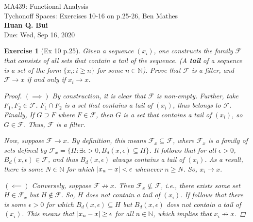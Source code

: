\documentclass[11pt]{article}
\newtheorem{exercise}{Exercise}
\newcommand{\N}{\mathbb{N}}
\newcommand{\F}{\mathcal{F}}
\begin{document}
\begin{center}
\begin{framed}
{\Large  MA439: Functional Analysis\\
	 Tychonoff Spaces:  Exercises 10-16 on p.25-26, Ben Mathes}\\
$\,$\\
{\Large \bf  Huan Q. Bui\\}
$\,$\\
{\Large Due: Wed, Sep 16, 2020}
\end{framed}
\end{center}

\begin{exercise}[Ex 10 p.25]
Given a sequence $(x_i)$, one constructs the family $\mathcal{F}$ that consists of all sets that contain a tail of the sequence. (A \textbf{tail} of a sequence is a set of the form $\{x_i : i \geq n \}$ for some $n \in \mathbb{N}$). Prove that $\mathcal{F}$ is a filter, and $\mathcal{F} \to x$ if and only if $x_i \to x$.
	\begin{proof}
	$(\implies)$ By construction, it is clear that $\F$ is non-empty. Further, take $F_1,F_2\in \F$. $F_1\cap F_2$ is a set that contains a tail of $(x_i)$, thus belongs to $\F$. Finally, If $G\supseteq F$ where $F\in \F$, then $G$ is a set that contains a tail of $(x_i)$, so $G\in \F$. Thus, $\F$ is a filter. 
	
	Now, suppose $\F \to x$. By definition, this means $\F_x \subseteq \F$, where $\F_x$ is a family of sets defined by $\F_x = \{ H : \exists \epsilon > 0, B_d(x,\epsilon) \subseteq H \}$. It follows that for all $\epsilon > 0$, $B_d(x,\epsilon) \in \F$, and thus $B_d(x,\epsilon)$ always contains a tail of $(x_i)$. As a result, there is some $N \in \mathbb{N}$ for which $\abs{x_n - x} < \epsilon$ whenever $n \geq N$. So, $x_i \to x$.
	
	$(\impliedby)$ Conversely, suppose $\F \not\to x$. Then $\F_x \not\subseteq \F$, i.e., there exists some set $H\in \F_x$ but $H \not\in \F$. So, $H$ does not contain a tail of $(x_i)$. If follows that there is some $\epsilon > 0$ for which $B_d(x,\epsilon) \subseteq H$ but $B_d(x,\epsilon)$ does not contain a tail of $(x_i)$. This means that $\abs{x_n - x} \geq \epsilon$ for all $n\in \N$, which implies that $x_i \not\to x$.
	\end{proof}
\end{exercise}
\end{document}
